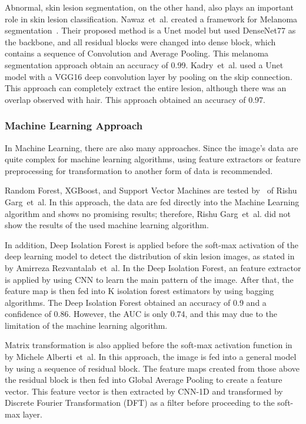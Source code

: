 \documentclass[sensors,article,accept,pdftex,moreauthors]{Definitions/mdpi}
\begin{document}
{		Abnormal, skin lesion segmentation, on the other hand, also plays an important role in skin lesion classification. Nawaz~et~al. created a framework for Melanoma segmentation~\mbox{\cite{22750}}. Their proposed method is a Unet model but used  DenseNet77 as the  backbone, and all residual blocks were changed into dense block, which contains a sequence of Convolution and  Average Pooling. This melanoma segmentation approach obtain an accuracy of 0.99. Kadry~et~al. used a Unet model with a VGG16 deep convolution layer by pooling on the skip connection. This approach can completely extract the entire lesion, although there was an overlap observed with hair. This approach obtained an  accuracy of 0.97.
		
		\subsubsection{Machine Learning Approach}
		In Machine Learning, there are also many approaches. Since the image's data are quite complex for machine learning algorithms,  using feature extractors or feature preprocessing for transformation to another form of data is recommended.
		
		Random Forest, XGBoost, and Support Vector Machines are tested by~\mbox{\cite{03798}} of Rishu Garg~et~al. In this approach, the data are fed directly into the Machine Learning algorithm and shows no promising results; therefore, Rishu Garg~et~al. did not show the results of the used machine learning algorithm.
		
		In addition, Deep Isolation Forest is applied before the soft-max activation of the deep learning model to detect the  distribution of skin lesion images, as stated in~\mbox{\cite{09365}} by Amirreza Rezvantalab~et~al. In the Deep Isolation Forest, an feature extractor is applied by using CNN to learn the main pattern of the image. After that, the feature map is then fed into K isolation forest estimators by using bagging algorithms. The Deep Isolation Forest obtained  an accuracy of 0.9 and a confidence of 0.86. However, the AUC is only 0.74, and this may due to the limitation of the machine learning algorithm. 
		
		Matrix transformation is also applied before the soft-max activation function in~\mbox{\cite{05045}} by Michele Alberti~et~al. In this approach, the image is fed into a general model by using a sequence of residual block. The feature maps created from those above the residual block is then fed into  Global Average Pooling to create a feature vector. This feature vector is then extracted by CNN-1D and transformed by Discrete Fourier Transformation (DFT) as a filter before proceeding to the soft-max layer. 
	}
	
\end{document}
